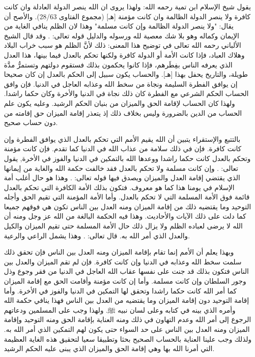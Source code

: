 يقول شيخ الإسلام ابن تمية رحمه الله:
ولهذا يروى ان الله ينصر الدولة العادلة وان كانت كافرة ولا ينصر الدولة الظالمة وان كانت مؤمنة
[هـ] {\footnotesize (مجموع الفتاوى 28/63)}.
والأصح أن يقال: "ولا ينصر الدولة الظالمة وإن كانت مسلمة" وهذا لان الظلم ينافي الغاية من الإيمان وكماله وهو بلا شك معصية لله ورسوله والدليل قوله تعالى:
\quranayah*[49][14]{\footnotesize \surahname*[49]}.
وقد قال الشيخ الألباني رحمه الله تعالى في توضيح هذا المعنى:
ذلك لأنَّ الظلم هو سبب خراب البلاد وهلاك العباد، فإذا كانت الأمة أو الدولة كافرة ولكنها تحكم بالعدل فيما بينها، هذا العدل الذي يعرفه الناس بفِطَرهم، فإذا كانوا يحكمون بذلك فستقوم دولتهم وتستمرُّ مدَّة طويلة، والتاريخ يحفل بهذا
[هـ].
والحساب يكون سبيل إلى الحكم بالعدل إن كان صحيحا إن يوافق الفطرة السليمة ونجاة من سخط الله وعذابه العاجل في الدنيا. فإن وافق الحساب الحكم الشرعي مع الفطرة كان ذلك نجاة في الدنيا والأخرة وكان حكما راشدا. ولهذا كان الحساب لإقامة الحق والميزان من بنيان الحكم الرشيد. وعليه يكون علم الحساب من الدين بالضرورة وليس بخلاف ذلك إذ يتعذر إقامة الميزان حق إقامته من دون حساب صحيح.

بالتتبع والإستقراء يتبين أن الله يقيم الأمم التي تحكم بالعدل الذي يوافق الفطرة وإن كانت كافرة. فإن في ذلك سلامة من عذاب الله في الدنيا كما تقدم. فإن كانت مؤمنة وتحكم بالعدل كانت حكما راشدا ووعدها الله بالتمكين في الدنيا والفوز في الأخرة, يقول تعالى:
\quranayah*[24][55]{\footnotesize \surahname*[24]}.
وإن كانت مسلمة ولا تحكم بالعدل فقد خالفت حكمة الله والغاية من إيمانها الذي يقتضي إقامة العدل والميزان ويصدق فيها قوله تعالى:
\quranayah*[49][14]{\footnotesize \surahname*[49]}. وهذا هو حال أغلب أمة الإسلام في يومنا هذا كما هو معروف. فتكون بذلك الأمة الكافرة التي تحكم بالعدل قائمة فوق الأمة المسلمة التي لا تحكم بالعدل. وأما الأمة المؤمنة التي تقيم الحق وأجله التوحيد وما يقتضيه ذلك من إقامة الميزان ومنه العدل بين الناس تكون هي فوقهم جميعا كما دلت على ذلك الآيات والأحاديث. وهذا فيه الحكمة البالغة من الله عز وجل ومنه أن الله لا يرضى لعباده الظلم ولا يزال ذلك حال الأمة المسلمة حتى تقيم الميزان والكيل والعدل الذي أمر الله به. قال تعالى:
\quranayah*[13][11][12]{\footnotesize \surahname*[13]}. وهذا يشمل الراعي والرعية.

وبهذا يعلم أن الأمم إنما تقام بإقامة الميزان ومنه العدل بين الناس فإن تحقق ذلك سلمت سخط الله وعذابه في الدنيا وإن كانت كافرة. فإن لم تقم الميزان والعدل بين الناس فتكون بذلك قد جنت على نفسها عقاب الله العاجل في الدنيا من فقر وجوع وذل وجور السلطان  وإن كانت مسلمة. وأما إن كانت مؤمنة وأقامت الحق مع إقامة الميزان كما أمر الله كانت حكما راشدا وتحقق لها التمكين في الدنيا والفوز في الأخرة. وأما إقامة التوحيد دون إقامة الميزان وما يقتضيه من العدل بين الناس فهذا ينافي حكمة الله وأمره الذي بينه في كتابه وعلى لسان نبيه ﷺ. ولهذا وجب على المسلمين ودعاتهم الرجوع إلى أمر الله وعدم التهاون في ذلك ومنه العناية بإقامة الحق ومنه التوحيد وإقامة الميزان ومنه العدل بين الناس على حد السواء حتى يكون لهم التمكين الذي أمر الله به. ولذلك وجب علينا العناية بالحساب الصحيح بحثا وتطبيقا سعيا لتحقيق هذه الغاية العظيمة التي أمرنا الله بها وهي إقامة الحق والميزان الذي يبنى عليه الحكم الرشيد.


